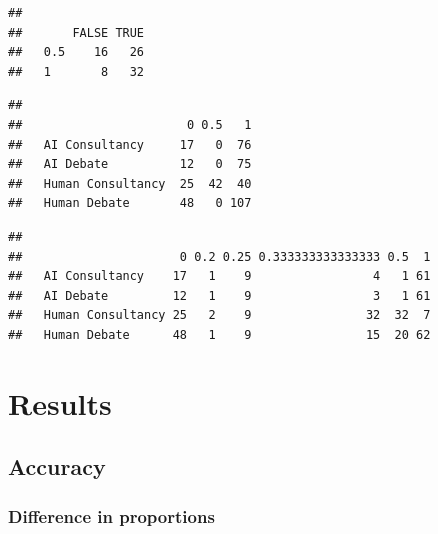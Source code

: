 \documentclass[
]{article}
\newenvironment{Shaded}{\begin{snugshade}}{\end{snugshade}}
\newcommand{\FunctionTok}[1]{\textcolor[rgb]{0.00,0.00,0.00}{#1}}
\newcommand{\NormalTok}[1]{#1}
\newcommand{\SpecialCharTok}[1]{\textcolor[rgb]{0.00,0.00,0.00}{#1}}
\begin{document}
\begin{verbatim}
##      
##       FALSE TRUE
##   0.5    16   26
##   1       8   32
\end{verbatim}

\begin{Shaded}
\end{Shaded}

\begin{verbatim}
##                    
##                       0 0.5   1
##   AI Consultancy     17   0  76
##   AI Debate          12   0  75
##   Human Consultancy  25  42  40
##   Human Debate       48   0 107
\end{verbatim}

\begin{Shaded}
\end{Shaded}

\begin{verbatim}
##                    
##                      0 0.2 0.25 0.333333333333333 0.5  1
##   AI Consultancy    17   1    9                 4   1 61
##   AI Debate         12   1    9                 3   1 61
##   Human Consultancy 25   2    9                32  32  7
##   Human Debate      48   1    9                15  20 62
\end{verbatim}

\hypertarget{results}{%
\section{Results}\label{results}}

\hypertarget{accuracy}{%
\subsection{Accuracy}\label{accuracy}}

\hypertarget{difference-in-proportions}{%
\subsubsection{Difference in
proportions}\label{difference-in-proportions}}
\end{document}

